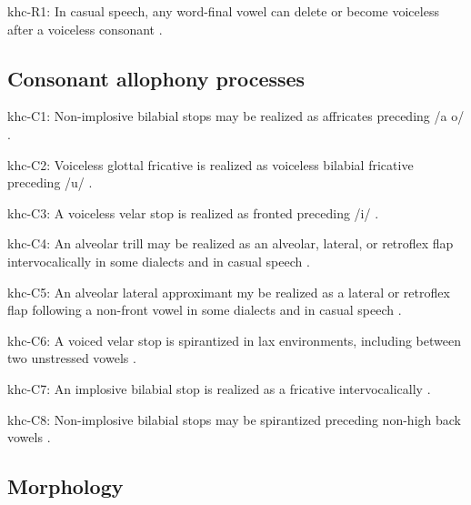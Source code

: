 {\begin{appendixdesc}
\item[khc-R1:] In casual speech, any word-final vowel can delete or become voiceless after a voiceless consonant \citep[23]{Donohue1999}.
\end{appendixdesc}
\subsection*{Consonant allophony processes}
\begin{appendixdesc}

\item[khc-C1:] Non-implosive bilabial stops may be realized as affricates preceding /a o/ \citep[16]{Donohue1999}.

\item[khc-C2:] Voiceless glottal fricative is realized as voiceless bilabial fricative preceding /u/ \citep[19]{Donohue1999}.

\item[khc-C3:] A voiceless velar stop is realized as fronted preceding /i/ \citep[19]{Donohue1999}.

\item[khc-C4:] An alveolar trill may be realized as an alveolar, lateral, or retroflex flap intervocalically in some dialects and in casual speech \citep[18]{Donohue1999}.

\item[khc-C5:] An alveolar lateral approximant my be realized as a lateral or retroflex flap following a non-front vowel in some dialects and in casual speech \citep[18]{Donohue1999}.

\item[khc-C6:] A voiced velar stop is spirantized in lax environments, including between two unstressed vowels \citep[27]{Donohue1999}.

\item[khc-C7:] An implosive bilabial stop is realized as a fricative intervocalically \citep[16]{Donohue1999}.

\item[khc-C8:] Non-implosive bilabial stops may be spirantized preceding non-high back vowels \citep[16]{Donohue1999}.
\end{appendixdesc}
\subsection*{Morphology}

\begin{appendixdesc}


\end{appendixdesc}}
